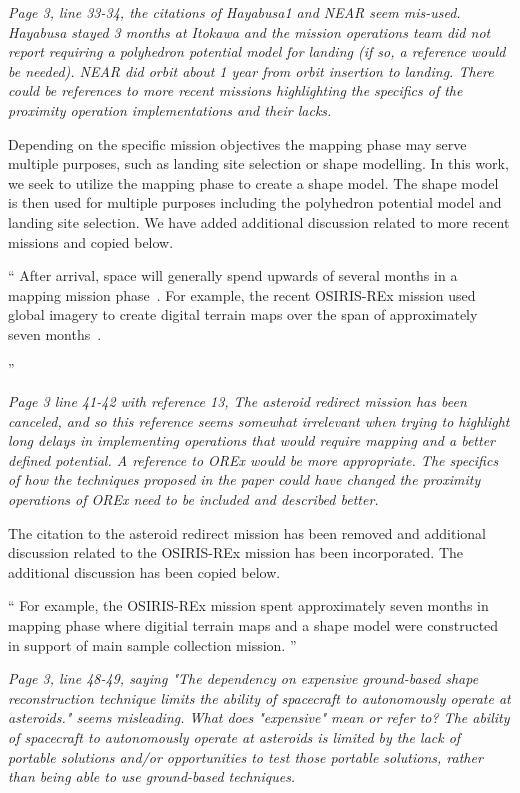\documentclass[11pt]{article}
\newenvironment{correction}{\begin{list}{}{\setlength{\leftmargin}{1cm}\setlength{\rightmargin}{1cm}}\vspace{\parsep}\item[]``}{''\end{list}}
\newcommand{\comment}[1]{\item \itshape #1 \normalfont}
\begin{document}
\begin{itemize}
\comment{
Page 3, line 33-34, the citations of Hayabusa1 and NEAR seem mis-used. Hayabusa stayed 3 months at Itokawa and the mission operations team did not report requiring a polyhedron potential model for landing (if so, a reference would be needed). 
NEAR did orbit about 1 year from orbit insertion to landing.
There could be references to more recent missions highlighting the specifics of the proximity operation implementations and their lacks.
}

Depending on the specific mission objectives the mapping phase may serve multiple purposes, such as landing site selection or shape modelling.
In this work, we seek to utilize the mapping phase to create a shape model.
The shape model is then used for multiple purposes including the polyhedron potential model and landing site selection.
We have added additional discussion related to more recent missions and copied below.

\begin{correction}
After arrival, space will generally spend upwards of several months in a mapping mission phase~\cite{williams2018,kubota2003,cole1998}.
For example, the recent OSIRIS-REx mission used global imagery to create digital terrain maps over the span of approximately seven months~\cite{williams2018}.

\end{correction}


\comment{
Page 3 line 41-42 with reference 13, The asteroid redirect mission has been canceled, and so this reference seems somewhat irrelevant when trying to highlight long delays in implementing operations that would require mapping and a better defined potential.
A reference to OREx would be more appropriate.
The specifics of how the techniques proposed in the paper could have changed the proximity operations of OREx need to be included and described better.
}



The citation to the asteroid redirect mission has been removed and additional discussion related to the OSIRIS-REx mission has been incorporated.
The additional discussion has been copied below.

\begin{correction}
For example, the OSIRIS-REx mission spent approximately seven months in mapping phase where digitial terrain maps and a shape model were constructed in support of main sample collection mission.
\end{correction}

\comment{
Page 3, line 48-49, saying "The dependency on expensive ground-based shape reconstruction technique limits the ability of spacecraft to autonomously operate at asteroids." seems misleading.
What does "expensive" mean or refer to? The ability of spacecraft to autonomously operate at asteroids is limited by the lack of portable solutions and/or opportunities to test those portable solutions, rather than being able to use ground-based techniques.
}


\end{itemize}
\end{document}
